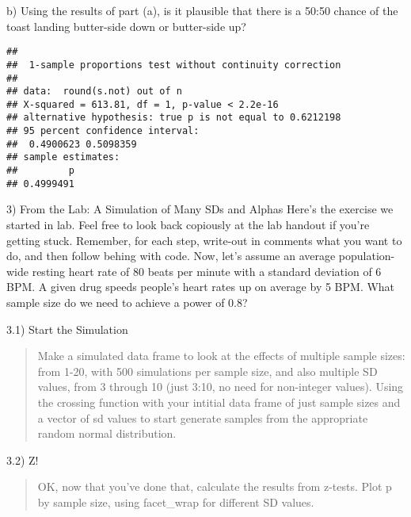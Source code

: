 \documentclass[ignorenonframetext,]{beamer}
\begin{document}
\begin{frame}[fragile]
\begin{block}{b) Using the results of part (a), is it plausible that
there is a 50:50 chance of the toast landing butter-side down or
butter-side up?}
\begin{verbatim}
## 
##  1-sample proportions test without continuity correction
## 
## data:  round(s.not) out of n
## X-squared = 613.81, df = 1, p-value < 2.2e-16
## alternative hypothesis: true p is not equal to 0.6212198
## 95 percent confidence interval:
##  0.4900623 0.5098359
## sample estimates:
##         p 
## 0.4999491
\end{verbatim}

\end{block}

\end{frame}

\begin{frame}{3) From the Lab: A Simulation of Many SDs and Alphas
\textbar{} Here's the exercise we started in lab. Feel free to look back
copiously at the lab handout if you're getting stuck. Remember, for each
step, write-out in comments what you want to do, and then follow behing
with code. \textbar{} Now, let's assume an average population-wide
resting heart rate of 80 beats per minute with a standard deviation of 6
BPM. \textbar{} A given drug speeds people's heart rates up on average
by 5 BPM. What sample size do we need to achieve a power of 0.8?}

\end{frame}

\begin{frame}{3.1) Start the Simulation}

\begin{quote}
Make a simulated data frame to look at the effects of multiple sample
sizes: from 1-20, with 500 simulations per sample size, and also
multiple SD values, from 3 through 10 (just 3:10, no need for
non-integer values). Using the crossing function with your intitial data
frame of just sample sizes and a vector of sd values to start generate
samples from the appropriate random normal distribution.
\end{quote}

\end{frame}

\begin{frame}{3.2) Z!}

\begin{quote}
OK, now that you've done that, calculate the results from z-tests. Plot
p by sample size, using facet\_wrap for different SD values.
\end{quote}

\end{frame}
\end{document}
